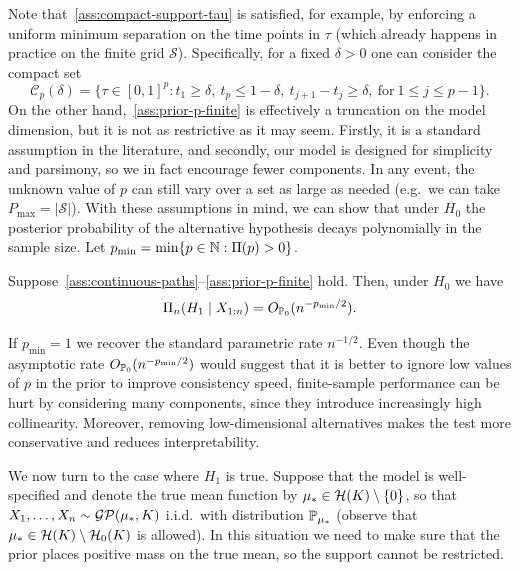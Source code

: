 Note that~\ref{ass:compact-support-tau} is satisfied, for example, by enforcing a uniform minimum separation on the time points in \(\tau\) (which already happens in practice on the finite grid \(\mathcal S\)). Specifically, for a fixed \(\delta>0\) one can consider the compact set
\[
\mathcal C_p(\delta) = \Big\{\tau\in [0,1]^p: t_1 \geq \delta,\ t_p \leq 1 - \delta,\ t_{j+1} - t_j \geq \delta,\ \text{for}\ 1\leq j \leq p-1\Big\}.
\]
On the other hand,~\ref{ass:prior-p-finite} is effectively a truncation on the model dimension, but it is not as restrictive as it may seem. Firstly, it is a standard assumption in the literature, and secondly, our model is designed for simplicity and parsimony, so we in fact encourage fewer components. In any event, the unknown value of \(p\) can still vary over a set as large as needed (e.g.\ we can take \(P_{\max}=|\mathcal S|\)). With these assumptions in mind, we can show that under \(H_0\) the posterior probability of the alternative hypothesis decays polynomially in the sample size. Let \(p_{\min}=\min\{p\in \mathbb{N}: \Pi(p)>0\}\).

\begin{theorem}\label{th:consistency-rates-h0}
  Suppose~\ref{ass:continuous-paths}--\ref{ass:prior-p-finite} hold. Then, under \(H_0\) we have 
  \[
    \Pi_n(H_1\mid X_{1:n}) = O_{\mathbb{P}_0}(n^{-p_{\min}/2}).
  \]
\end{theorem}

\begin{remark}
  If \(p_{\min}=1\) we recover the standard parametric rate \(n^{-1/2}\). Even though the asymptotic rate \(O_{\mathbb{P}_0}(n^{-p_{\min}/2})\) would suggest that it is better to ignore low values of \(p\) in the prior to improve consistency speed, finite-sample performance can be hurt by considering many components, since they introduce increasingly high collinearity. Moreover, removing low-dimensional alternatives makes the test more conservative and reduces interpretability.
\end{remark}

We now turn to the case where \(H_1\) is true. Suppose that the model is well-specified and denote the true mean function by \(\mu_*\in \mathcal{H}(K) \setminus \{0\}\), so that \(X_1,\dots,X_n \sim \operatorname{\mathcal{GP}}(\mu_*, K)\) i.i.d.\ with distribution \(\mathbb{P}_{\mu_*}\) (observe that \(\mu_*\in\mathcal{H}(K)\setminus \mathcal{H}_0(K)\) is allowed). In this situation we need to make sure that the prior places positive mass on the true mean, so the support cannot be restricted.

